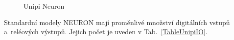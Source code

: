 \begin{figure}[!ht]
    \centering
			\hspace*{5mm}
			\hspace*{5mm}
			\caption{Unipi Neuron~\cite{UniPiBoard2}}
			\label{UnipiNeuronModels}
\end{figure}

\vspace{10pt}
Standardní modely NEURON mají proměnlivé množství digitálních vstupů a~reléových výstupů. Jejich počet je uveden v Tab.~\ref{TableUnipiIO}.

